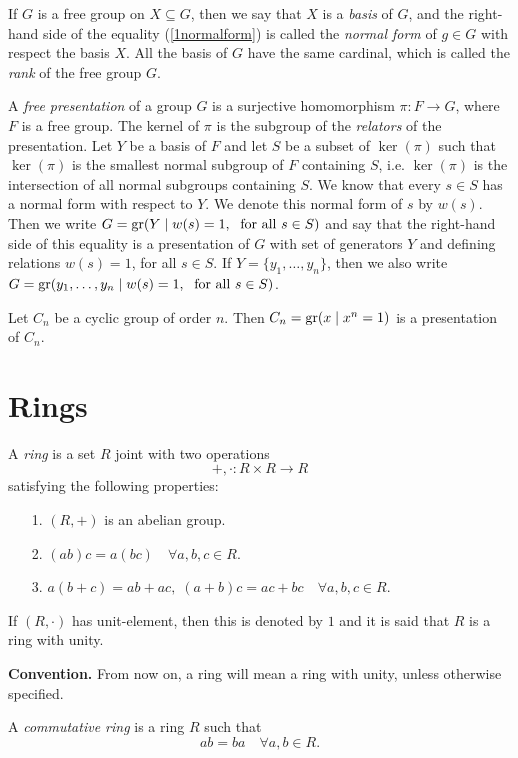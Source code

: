 {If $G$ is a free group on $X\subseteq G$, then we say that $X$ is a {\em basis} of $G$, and the right-hand side of the equality (\ref{1normalform}) is called the {\em normal form} of $g\in G$ with respect the basis $X$. All the basis of $G$ have the same cardinal,
which is called the {\em rank} of the free group $G$.

A {\em free presentation} of a group $G$ is a surjective homomorphism $\pi \colon F\rightarrow G$, where $F$ is a free group. The kernel of $\pi$ is the subgroup of the {\em relators} of the presentation. Let $Y$ be a basis of $F$ and let $S$ be a subset of $\ker(\pi)$ such that $\ker(\pi)$ is the smallest normal subgroup of $F$ containing $S$, i.e. $\ker(\pi)$ is the intersection of all normal subgroups containing $S$. We know that every $s\in S$ has a normal form with respect to $Y$. We denote this normal form of $s$ by $w(s)$. Then we write
$G=\operatorname{gr}(Y\mid w(s)=1,\;\mbox{ for all }s\in S)$ and say that the right-hand side of this equality is a presentation of $G$ with set of generators $Y$ and defining relations $w(s)=1$, for all $s\in S$. If $Y=\{ y_1,\dots, y_n\}$, then we also write
$G=\operatorname{gr}(y_1,\dots, y_n\mid w(s)=1,\;\mbox{ for all }s\in S)$.

\begin{example}
Let $C_n$ be a cyclic group of order $n$. Then $C_n=\operatorname{gr}(x\mid x^n=1)$ is a presentation of $C_n$.
\end{example}
}

\section*{Rings}

A {\em ring} is a set $R$ joint with two operations
$$+,\cdot\colon R\times R\rightarrow R$$
satisfying the following properties:
\begin{itemize}
	\item[1.] $(R,+)$ is an abelian group.
	\item[2.] $(ab)c=a(bc)\quad\forall a,b,c\in R$.
    \item[3.] $a(b+c)=ab+ac,\; (a+b)c=ac+bc\quad\forall a,b,c\in R$.
\end{itemize}
If $(R,\cdot)$ has unit-element, then this is denoted by $1$ and it is said that $R$ is a ring with unity.
\bigskip

{\bf Convention.} From now on, a ring will mean a ring with unity, unless otherwise specified. 
\bigskip

A {\em commutative ring} is a ring $R$ such that
$$ab=ba\quad\forall a,b\in R.$$


